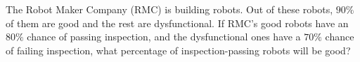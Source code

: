 The Robot Maker Company (RMC) is building robots. Out of these robots, $90\%$ of them are good and the rest are dysfunctional. If RMC's good robots have an $80\%$ chance of passing inspection, and the dysfunctional ones have a $70\%$ chance of failing inspection, what percentage of inspection-passing robots will be good?
